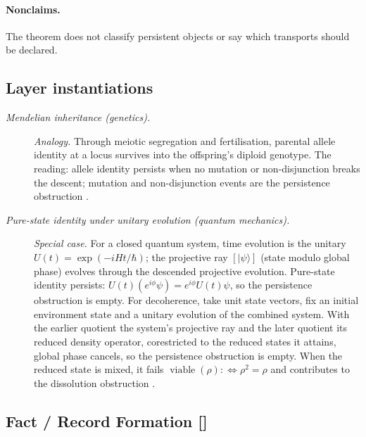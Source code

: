 \paragraph{Nonclaims.} The theorem does not classify persistent objects or say which
transports should be declared.

\subsection*{Layer instantiations}\label{layer-inst:F19}

\begingroup\small
\begin{description}
\item[\emph{Mendelian inheritance (genetics).}] \textit{Analogy.}
Through meiotic segregation and fertilisation, parental allele
identity at a locus survives into the offspring's diploid
genotype.  The  reading: allele identity persists when no
mutation or non-disjunction breaks the descent; mutation and
non-disjunction events are the persistence obstruction
\citep{Mendel1866VersuchePflanzenHybriden}.

\item[\emph{Pure-state identity under unitary evolution (quantum
mechanics).}] \textit{Special case.}
For a closed quantum system, time evolution is the unitary
\(U(t)=\exp(-iHt/\hbar)\); the projective ray
\([|\psi\rangle]\) (state modulo global phase) evolves through the
descended projective evolution.  Pure-state identity persists:
\(U(t)(e^{i\phi}\psi)=e^{i\phi}U(t)\psi\), so the persistence
obstruction is empty.  For decoherence, take unit state vectors, fix an initial environment state
and a unitary evolution of the combined system. With the earlier quotient
the system's projective ray and the later quotient its reduced density
operator, corestricted to the reduced states it attains, global phase cancels, so the persistence obstruction is empty.
When the reduced state is mixed, it fails
\(\operatorname{viable}(\rho):\Leftrightarrow\rho^2=\rho\) and contributes to
the dissolution obstruction \citep{vonNeumann1932MathematischeGrundlagen}.

\end{description}
\endgroup


\subsection{Fact / Record Formation [\texorpdfstring{}{F20}]}\label{sec:status-records-coherence:fact-record}

